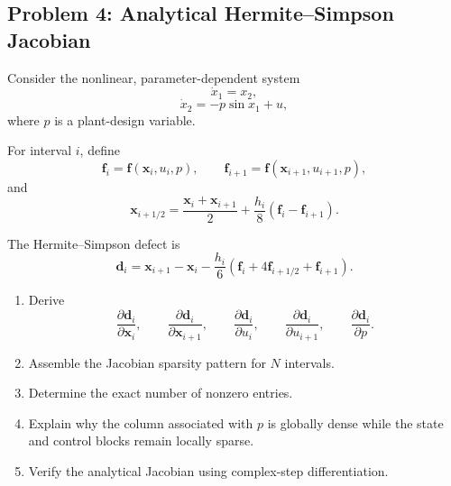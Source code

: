 \subsection*{Problem 4: Analytical Hermite--Simpson Jacobian}

Consider the nonlinear, parameter-dependent system
\begin{equation}
\dot{x}_1=x_2,
\end{equation}
\begin{equation}
\dot{x}_2=-p\sin x_1+u,
\end{equation}
where $p$ is a plant-design variable.

For interval $i$, define
\begin{equation}
\mathbf{f}_i
=
\mathbf{f}(\mathbf{x}_i,u_i,p),
\qquad
\mathbf{f}_{i+1}
=
\mathbf{f}(\mathbf{x}_{i+1},u_{i+1},p),
\end{equation}
and
\begin{equation}
\mathbf{x}_{i+1/2}
=
\frac{\mathbf{x}_i+\mathbf{x}_{i+1}}{2}
+
\frac{h_i}{8}
\left(
\mathbf{f}_i-\mathbf{f}_{i+1}
\right).
\end{equation}

The Hermite--Simpson defect is
\begin{equation}
\mathbf{d}_i
=
\mathbf{x}_{i+1}
-
\mathbf{x}_i
-
\frac{h_i}{6}
\left(
\mathbf{f}_i
+
4\mathbf{f}_{i+1/2}
+
\mathbf{f}_{i+1}
\right).
\end{equation}

\begin{enumerate}
    \item Derive
    \begin{equation}
    \frac{\partial\mathbf{d}_i}{\partial\mathbf{x}_i},
    \qquad
    \frac{\partial\mathbf{d}_i}{\partial\mathbf{x}_{i+1}},
    \qquad
    \frac{\partial\mathbf{d}_i}{\partial u_i},
    \qquad
    \frac{\partial\mathbf{d}_i}{\partial u_{i+1}},
    \qquad
    \frac{\partial\mathbf{d}_i}{\partial p}.
    \end{equation}
    
    \item Assemble the Jacobian sparsity pattern for $N$ intervals.
    
    \item Determine the exact number of nonzero entries.
    
    \item Explain why the column associated with $p$ is globally dense while
    the state and control blocks remain locally sparse.
    
    \item Verify the analytical Jacobian using complex-step differentiation.
\end{enumerate}


